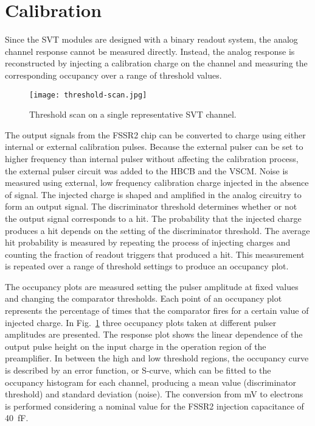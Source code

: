 \section{Calibration}

Since the SVT modules are designed with a binary readout system, the analog channel response cannot be measured directly. Instead, the analog response is reconstructed by injecting a calibration charge on the channel and measuring the corresponding occupancy over a range of threshold values. 

\begin{figure}[hbt] 
	\centering 
	\texttt{[image: threshold-scan.jpg]}
	\caption{Threshold scan on a single representative SVT channel.}
	\label{fig:threshold-scan}
\end{figure}

The output signals from the FSSR2 chip can be converted to charge using either internal or external calibration pulses. Because the external pulser can be set to higher frequency than internal pulser without affecting the calibration process, the external pulser circuit was added to the HBCB and the VSCM. Noise is measured using external, low frequency calibration charge injected in the absence of signal. The injected charge is shaped and amplified in the analog circuitry to form an output signal. The discriminator threshold determines whether or not the output signal corresponds to a hit. The probability that the injected charge produces a hit depends on the setting of the discriminator threshold. The average hit probability is measured by repeating the process of injecting charges and counting the fraction of readout triggers that produced a hit. This measurement is repeated over a range of threshold settings to produce an occupancy plot. 

The occupancy plots are measured setting the pulser amplitude at fixed values and changing the comparator thresholds. Each point of an occupancy plot represents the percentage of times that the comparator fires for a certain value of injected charge. In Fig.~\ref{fig:threshold-scan} three occupancy plots taken at different pulser amplitudes are presented. The response plot shows the linear dependence of the output pulse height on the input charge in the operation region of the preamplifier. In between the high and low threshold regions, the occupancy curve is described by an error function, or S-curve, which can be fitted to the occupancy histogram for each channel, producing a mean value (discriminator threshold) and standard deviation (noise). The conversion from mV to electrons is performed considering a nominal value for the FSSR2 injection capacitance of 40~fF. 

